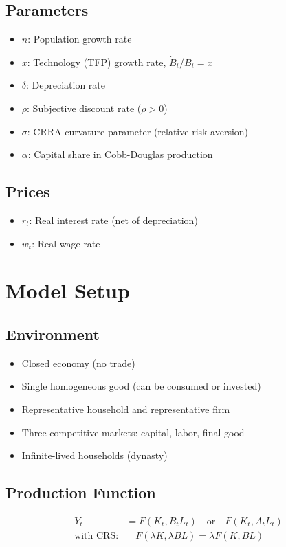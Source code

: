 \documentclass[a4paper,11pt]{article}
\begin{document}
\subsection*{Parameters}
\begin{itemize}
    \item $n$: Population growth rate
    \item $x$: Technology (TFP) growth rate, $\dot{B}_t/B_t = x$
    \item $\delta$: Depreciation rate
    \item $\rho$: Subjective discount rate ($\rho > 0$)
    \item $\sigma$: CRRA curvature parameter (relative risk aversion)
    \item $\alpha$: Capital share in Cobb-Douglas production
\end{itemize}

\subsection*{Prices}
\begin{itemize}
    \item $r_t$: Real interest rate (net of depreciation)
    \item $w_t$: Real wage rate
\end{itemize}

\section{Model Setup}

\subsection*{Environment}
\begin{itemize}
    \item Closed economy (no trade)
    \item Single homogeneous good (can be consumed or invested)
    \item Representative household and representative firm
    \item Three competitive markets: capital, labor, final good
    \item Infinite-lived households (dynasty)
\end{itemize}

\subsection*{Production Function}
\begin{align*}
    Y_t &= F(K_t, B_t L_t) \quad \text{or} \quad F(K_t, A_t L_t) \\
    \text{with CRS:} &\quad F(\lambda K, \lambda B L) = \lambda F(K, BL)
\end{align*}
\end{document}
